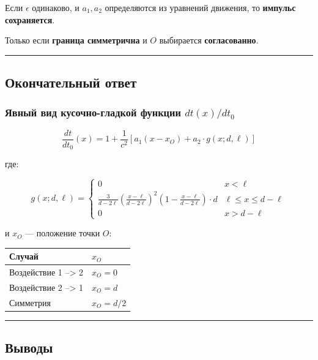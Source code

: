 \documentclass[11pt]{article}
\begin{document}
Если \(\epsilon\) одинаково, и \(a_1, a_2\) определяются из уравнений
движения, то \textbf{импульс сохраняется}.

 Только если \textbf{граница симметрична} и \(O\) выбирается
\textbf{согласованно}.

\begin{center}\rule{0.5\linewidth}{\linethickness}\end{center}

\subsection{ Окончательный ответ}
\subsubsection{\texorpdfstring{Явный вид кусочно-гладкой функции
\(dt(x)/dt_0\)}{Явный вид кусочно-гладкой функции dt(x)/dt\_0}}

\[
\boxed{
\frac{dt}{dt_0}(x) = 1 + \frac{1}{c^2} \left[ a_1 (x - x_O) + a_2 \cdot g(x; d, \ell) \right]
}
\]

где:

\[
g(x; d, \ell) =
\begin{cases}
0 & x < \ell \\
\frac{3}{d - 2\ell} \left( \frac{x - \ell}{d - 2\ell} \right)^2 \left( 1 - \frac{x - \ell}{d - 2\ell} \right) \cdot d & \ell \le x \le d - \ell \\
0 & x > d - \ell
\end{cases}
\]

и \(x_O\) --- положение точки \(O\):

\begin{longtable}[]{@{}ll@{}}
\toprule
Случай & \(x_O\)\tabularnewline
\midrule
\endhead
Воздействие 1 --> 2 & \(x_O = 0\)\tabularnewline
Воздействие 2 --> 1 & \(x_O = d\)\tabularnewline
Симметрия & \(x_O = d/2\)\tabularnewline
\bottomrule
\end{longtable}

\begin{center}\rule{0.5\linewidth}{\linethickness}\end{center}

\subsection{ Выводы}
\end{document}
